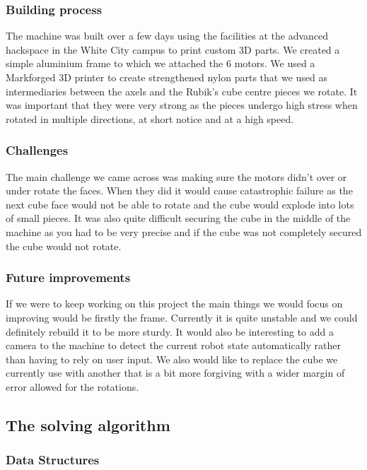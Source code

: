 \documentclass[8pt]{article}
\begin{document}
\subsubsection{Building process}

The machine was built over a few days using the facilities at the advanced
hackspace in the White City campus to print custom 3D parts. We created a simple
aluminium frame to which we attached the 6 motors. We used a Markforged
3D printer to create strengthened nylon parts that we used as intermediaries
between the axels and the Rubik's cube centre pieces we rotate. It was important that
they were very strong as the pieces undergo high stress when rotated in
multiple directions, at short notice and at a high speed.
\subsubsection{Challenges}

The main challenge we came across was making sure the motors didn't over or under
rotate the faces. When they did it would cause catastrophic failure as the next
cube face would not be able to rotate and the cube would explode into lots of small
pieces. It was also quite difficult securing the cube in the middle of the machine
as you had to be very precise and if the cube was not completely secured the cube
would not rotate.

\subsubsection{Future improvements}

If we were to keep working on this project the main things we would focus
on improving would be firstly the frame. Currently it is quite unstable and we
could definitely rebuild it to be more sturdy. It would also be interesting to
add a camera to the machine to detect the current robot state automatically rather
than having to rely on user input. We also would like to replace the cube we currently
use with another that is a bit more forgiving with a wider margin of error allowed
for the rotations.

\subsection{The solving algorithm}
\subsubsection{Data Structures}
\end{document}

